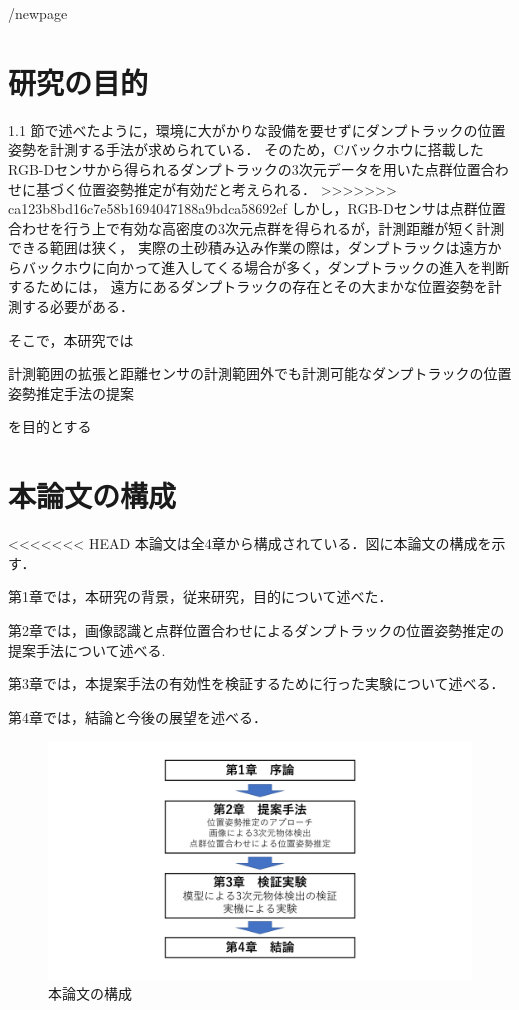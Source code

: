 /newpage
\section{研究の目的}
1.1 節で述べたように，環境に大がかりな設備を要せずにダンプトラックの位置姿勢を計測する手法が求められている．
そのため，Cバックホウに搭載したRGB-Dセンサから得られるダンプトラックの3次元データを用いた点群位置合わせに基づく位置姿勢推定が有効だと考えられる．
>>>>>>> ca123b8bd16c7e58b1694047188a9bdca58692ef
しかし，RGB-Dセンサは点群位置合わせを行う上で有効な高密度の3次元点群を得られるが，計測距離が短く計測できる範囲は狭く，
実際の土砂積み込み作業の際は，ダンプトラックは遠方からバックホウに向かって進入してくる場合が多く，ダンプトラックの進入を判断するためには，
遠方にあるダンプトラックの存在とその大まかな位置姿勢を計測する必要がある．



\par
そこで，本研究では
    \begin{screen}
        \begin{center}
        計測範囲の拡張と距離センサの計測範囲外でも計測可能なダンプトラックの位置姿勢推定手法の提案
        \end{center}
    \end{screen}
を目的とする
\newpage
\section{本論文の構成}
<<<<<<< HEAD
本論文は全4章から構成されている．図に本論文の構成を示す．\par
第1章では，本研究の背景，従来研究，目的について述べた．\par
第2章では，画像認識と点群位置合わせによるダンプトラックの位置姿勢推定の提案手法について述べる.\par
第3章では，本提案手法の有効性を検証するために行った実験について述べる．\par
第4章では，結論と今後の展望を述べる．
\begin{figure}[b]
    \begin{center}
    \includegraphics[width=0.3 \columnwidth]{./chap1/fig/struct.jpg}
    \caption{本論文の構成}
    \label{fig:flow}
    \end{center}
   \end{figure}


